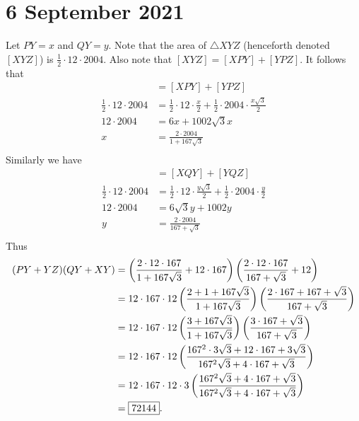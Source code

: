 \documentclass[letterpaper,oneside]{scrartcl}
\begin{document}
\section*{6 September 2021}
Let \(PY=x\)  and \(QY=y.\)
Note that the area of \(\triangle XYZ\) (henceforth denoted \([XYZ]\)) is \(\frac{1}{2}\cdot12\cdot2004.\)
Also note that \([XYZ]=[XPY]+[YPZ].\) It follows that
\begin{align*}
    [XYZ]                   & =[XPY]+[YPZ]                                                            \\
    \frac12\cdot12\cdot2004 & = \frac12\cdot12\cdot\frac{x}{2}+\frac12\cdot2004\cdot\frac{x\sqrt3}{2} \\
    12\cdot2004             & =6x+1002\sqrt3x                                                         \\
    x                       & = \frac{2\cdot2004}{1+167\sqrt3}                                        \\
\end{align*}
Similarly we have
\begin{align*}
    [XYZ]                   & =[XQY]+[YQZ]                                                            \\
    \frac12\cdot12\cdot2004 & = \frac12\cdot12\cdot\frac{y\sqrt3}{2}+\frac12\cdot2004\cdot\frac{y}{2} \\
    12\cdot2004             & =6\sqrt3y+1002y                                                         \\
    y                       & =\frac{2\cdot2004}{167+\sqrt3}                                          \\
\end{align*}
Thus
\begin{align*}
    (PY+YZ)(QY+XY) & =\left(\frac{2\cdot12\cdot167}{1+167\sqrt3}+12\cdot167\right)\left(\frac{2\cdot12\cdot167}{167+\sqrt3}+12\right)     \\
                   & =12\cdot167\cdot12\left(\frac{2+1+167\sqrt3}{1+167\sqrt3}\right)\left(\frac{2\cdot167+167+\sqrt3}{167+\sqrt3}\right) \\
                   & =12\cdot167\cdot12\left(\frac{3+167\sqrt3}{1+167\sqrt3}\right)\left(\frac{3\cdot167+\sqrt3}{167+\sqrt3}\right)       \\
                   & =12\cdot167\cdot12\left(\frac{167^2\cdot3\sqrt3+12\cdot167+3\sqrt3}{167^2\sqrt3+4\cdot167+\sqrt3}\right)             \\
                   & =12\cdot167\cdot12\cdot3\left(\frac{167^2\sqrt3+4\cdot167+\sqrt3}{167^2\sqrt3+4\cdot167+\sqrt3}\right)               \\
                   & =\fbox{72144}.
\end{align*}
\end{document}
